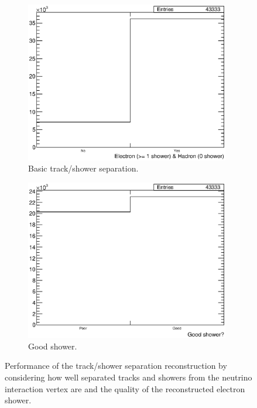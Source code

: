 \begin{figure}
  \centering
  \begin{subfigure}[t]{0.48\linewidth}
    \centering
    \includegraphics[width=0.98\textwidth]{TrackShowerSeparation.eps}
    \caption{Basic track/shower separation.}
    \label{fig:TrackShowerSeparation}
  \end{subfigure}
  \hfill
  \begin{subfigure}[t]{0.48\linewidth}
    \centering
    \includegraphics[width=0.98\textwidth]{ElectronGoodShower.eps}
    \caption{Good shower.}
    \label{fig:GoodShower}
  \end{subfigure}
  \caption[Performance of the track/shower separation reconstruction by considering how well separated tracks and showers from the neutrino interaction vertex are, and the quality of the reconstructed electron shower.]{Performance of the track/shower separation reconstruction by considering how well separated tracks and showers from the neutrino interaction vertex are and the quality of the reconstructed electron shower.}
  \label{fig:GoodReconstructionComponents}
\end{figure}

